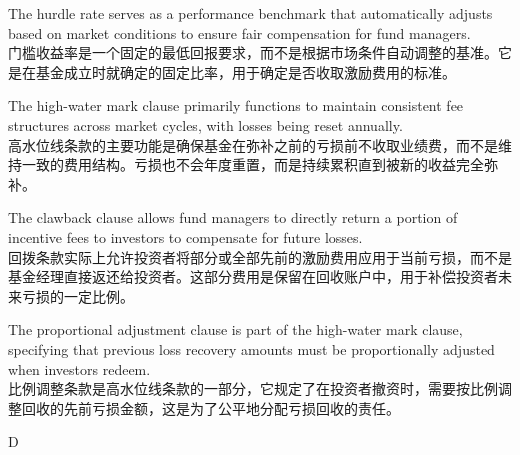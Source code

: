 \documentclass{article}
\begin{document}
\begin{choices}
    \item The hurdle rate serves as a performance benchmark that automatically adjusts based on market conditions to ensure fair compensation for fund managers.\\
    门槛收益率是一个固定的最低回报要求，而不是根据市场条件自动调整的基准。它是在基金成立时就确定的固定比率，用于确定是否收取激励费用的标准。
    \item The high-water mark clause primarily functions to maintain consistent fee structures across market cycles, with losses being reset annually.\\
    高水位线条款的主要功能是确保基金在弥补之前的亏损前不收取业绩费，而不是维持一致的费用结构。亏损也不会年度重置，而是持续累积直到被新的收益完全弥补。
    \item The clawback clause allows fund managers to directly return a portion of incentive fees to investors to compensate for future losses.\\
    回拨条款实际上允许投资者将部分或全部先前的激励费用应用于当前亏损，而不是基金经理直接返还给投资者。这部分费用是保留在回收账户中，用于补偿投资者未来亏损的一定比例。
    \item The proportional adjustment clause is part of the high-water mark clause, specifying that previous loss recovery amounts must be proportionally adjusted when investors redeem.\\
    比例调整条款是高水位线条款的一部分，它规定了在投资者撤资时，需要按比例调整回收的先前亏损金额，这是为了公平地分配亏损回收的责任。
\end{choices}

\begin{correctanswer}
    D
\end{correctanswer}
\end{document}
